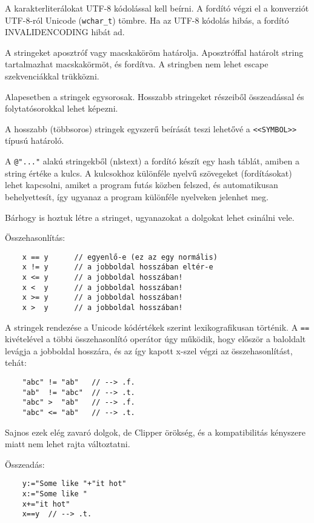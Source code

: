 A karakterliterálokat UTF-8 kódolással kell beírni. 
A fordító végzi el a konverziót UTF-8-ról Unicode (\verb!wchar_t!) tömbre.
Ha az  UTF-8 kódolás hibás, a fordító INVALIDENCODING hibát ad.

A stringeket aposztróf vagy macskaköröm határolja.
Aposztróffal határolt string tartalmazhat macskakörmöt, és fordítva.
A stringben nem lehet escape szekvenciákkal trükközni.

Alapesetben a stringek egysorosak. 
Hosszabb stringeket részeiből összeadással és folytatósorokkal lehet képezni.

A hosszabb (többsoros) stringek egyszerű beírását teszi lehetővé 
a \verb!<<SYMBOL>>! típusú határoló.

A \verb!@"..."! alakú stringekből (nlstext) a fordító készít egy hash táblát, 
amiben a string értéke a kulcs. A kulcsokhoz különféle nyelvű szövegeket
(fordításokat) lehet kapcsolni, amiket a program futás közben felszed,
és automatikusan behelyettesít, így ugyanaz a program különféle nyelveken 
jelenhet meg.

Bárhogy is hoztuk létre a stringet,  ugyanazokat a dolgokat lehet
csinálni vele.


Összehasonlítás:
\begin{verbatim}
    x == y      // egyenlő-e (ez az egy normális)
    x != y      // a jobboldal hosszában eltér-e
    x <= y      // a jobboldal hosszában! 
    x <  y      // a jobboldal hosszában! 
    x >= y      // a jobboldal hosszában! 
    x >  y      // a jobboldal hosszában! 
\end{verbatim}

A stringek rendezése a Unicode kódértékek szerint lexikografikusan történik.
A \verb!==! kivételével a többi összehasonlító operátor úgy működik,
hogy először a baloldalt levágja a jobboldal hosszára, és az így kapott
x-szel végzi az összehasonlítást, tehát:

\begin{verbatim}
    "abc" != "ab"   // --> .f.
    "ab"  != "abc"  // --> .t.
    "abc" >  "ab"   // --> .f.
    "abc" <= "ab"   // --> .t.
\end{verbatim}
Sajnos ezek elég zavaró dolgok, de Clipper örökség,
és a kompatibilitás kényszere miatt nem lehet rajta változtatni.


Összeadás:
\begin{verbatim}
    y:="Some like "+"it hot"
    x:="Some like "
    x+="it hot"
    x==y  // --> .t.
\end{verbatim}

